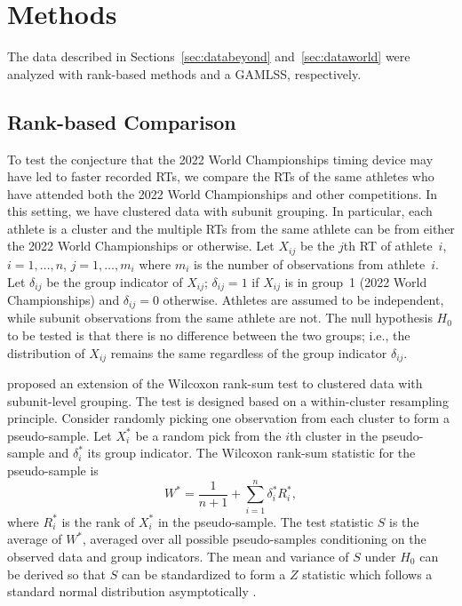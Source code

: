 \documentclass[12pt, letterpaper]{article}
\begin{document}
\section{Methods} \label{sec:methods}

The data described in Sections~\ref{sec:databeyond} and~\ref{sec:dataworld} were
analyzed with rank-based methods and a GAMLSS, respectively.


\subsection{Rank-based Comparison}\label{sec:rank}


To test the conjecture that the 2022 World Championships timing device may have
led to faster recorded RTs, we compare the RTs of the same
athletes who have attended both the 2022 World Championships and other
competitions.
In this setting, we have clustered data with subunit grouping. In particular,
each athlete is a cluster and the multiple RTs from the same athlete
can be from either the 2022 World Championships or otherwise.
Let $X_{ij}$ be the $j$th RT of athlete~$i$, $i = 1, \ldots, n$,
$j = 1, \ldots, m_i$ where $m_i$ is the number of observations from
athlete~$i$. Let $\delta_{ij}$ be the group indicator of $X_{ij}$; $\delta_{ij}
= 1$ if $X_{ij}$ is in group~1 (2022 World Championships) and $\delta_{ij} = 0$
otherwise. Athletes are
assumed to be independent, while subunit observations from the same athlete are
not. The null hypothesis $H_0$ to be tested is that there is no difference
between the two groups; i.e., the distribution of $X_{ij}$ remains the same
regardless of the group indicator $\delta_{ij}$.


\citet{datta2005rank} proposed an extension of the Wilcoxon rank-sum test to
clustered data with subunit-level grouping. The test is designed based on a
within-cluster resampling principle. Consider randomly picking one observation
from each cluster to form a pseudo-sample. Let $X_i^*$ be a random pick from the
$i$th cluster in the pseudo-sample and $\delta_i^*$ its group indicator. The
Wilcoxon rank-sum statistic for the pseudo-sample is
\[
W^* = \frac{1}{n + 1} + \sum_{i=1}^{n} \delta_{i}^{*} R_{i}^{*},
\]
where $R_{i}^{*}$ is the rank of $X_{i}^{*}$ in the pseudo-sample.
The test statistic $S$ is the average of $W^*$, averaged over all possible
pseudo-samples conditioning on the observed data and group indicators.
The mean and variance of $S$ under $H_0$ can be derived so that $S$ can be
standardized to form a $Z$ statistic which follows a standard normal distribution
asymptotically \citep[p.910]{datta2005rank}.
\end{document}
